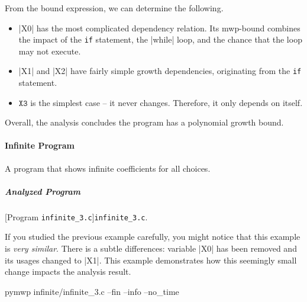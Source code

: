 From the bound expression, we can determine the following.

\begin{itemize}
\item \pr|X0| has the most complicated dependency relation.
Its mwp-bound combines the impact of the \texttt{if} statement, the \pr|while| loop, and the chance that the loop may not execute.

\item \pr|X1| and \pr|X2| have fairly simple growth dependencies, originating from the \texttt{if} statement.

\item \(\texttt{X3}\) is the simplest case -- it never changes.
Therefore, it only depends on itself.
\end{itemize}

Overall, the analysis concludes the program has a polynomial growth bound.

\paragraph{Infinite Program}\label{inf-prog}
A program that shows infinite coefficients for all choices.

\subparagraph*{Analyzed Program}

\begin{center}
\begin{minipage}{\textwidth}
\captionsetup{type=lstlisting}
[Program \texttt{infinite\_3.c}]{\texttt{infinite\_3.c}.}
\label{lst:inifnite3}
\end{minipage}
\end{center}

If you studied the previous example carefully, you might notice that this example is \emph{very similar}.
There is a subtle differences: variable \pr|X0| has been removed and its usages changed to \pr|X1|.
This example demonstrates how this seemingly small change impacts the analysis result.

\begin{center}
\begin{minipage}{\textwidth}
\begin{cmdlisting}[label={lst:ex4-run-cmd}]
pymwp infinite/infinite_3.c --fin --info --no_time
\end{cmdlisting}
\end{minipage}
\end{center}

